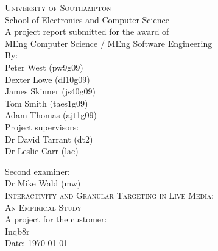 
\begin{titlepage}

\begin{center}

\textsc{\large{University of Southampton}}\\[0.0cm]

\large{School of Electronics and Computer Science}\\[2.0cm]

\large{A project report submitted for the award of}\\[0.0cm]

\large{MEng Computer Science / MEng Software Engineering}\\[2.0cm]

\large{
	By: \\
	Peter West (pw9g09) \\
	Dexter Lowe (dl10g09) \\
	James Skinner (js40g09) \\
	Tom Smith (taes1g09)}\\
	Adam Thomas (ajt1g09) \\[2.0cm]

\large{Project supervisors: \\
		Dr David Tarrant (dt2) \\
		Dr Leslie Carr (lac)}

\large{Second examiner: \\
		Dr Mike Wald (mw)}\\[2.0cm]


\textsc{\large Interactivity and Granular Targeting in Live Media: \\
		An Empirical Study}\\[2.0cm]

\large{A project for the customer: \\
		Inqb8r}\\[2.0cm]

\large{Date: \today}\\[4.0cm]

\end{center}

\end{titlepage}

